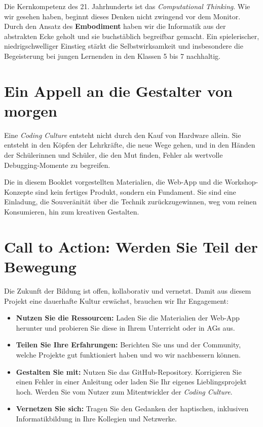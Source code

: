 \documentclass[a5paper,pagesize,10pt,bibtotoc,pointlessnumbers,
normalheadings,DIV=9,twoside=false]{scrbook}
\begin{document}
Die Kernkompetenz des 21. Jahrhunderts ist das \textit{Computational Thinking}. Wie wir gesehen haben, beginnt dieses Denken nicht zwingend vor dem Monitor. Durch den Ansatz des \textbf{Embodiment} haben wir die Informatik aus der abstrakten Ecke geholt und sie buchstäblich begreifbar gemacht. Ein spielerischer, niedrigschwelliger Einstieg stärkt die Selbstwirksamkeit und insbesondere die Begeisterung bei jungen Lernenden in den Klassen 5 bis 7 nachhaltig.

\section*{Ein Appell an die Gestalter von morgen}

Eine \textit{Coding Culture} entsteht nicht durch den Kauf von Hardware allein. Sie entsteht in den Köpfen der Lehrkräfte, die neue Wege gehen, und in den Händen der Schülerinnen und Schüler, die den Mut finden, Fehler als wertvolle Debugging-Momente zu begreifen. 

Die in diesem Booklet vorgestellten Materialien, die Web-App und die Workshop-Konzepte sind kein fertiges Produkt, sondern ein Fundament. Sie sind eine Einladung, die Souveränität über die Technik zurückzugewinnen, weg vom reinen Konsumieren, hin zum kreativen Gestalten.

\section*{Call to Action: Werden Sie Teil der Bewegung}

Die Zukunft der Bildung ist offen, kollaborativ und vernetzt. Damit aus diesem Projekt eine dauerhafte Kultur erwächst, brauchen wir Ihr Engagement:

\begin{itemize}
    \item \textbf{Nutzen Sie die Ressourcen:} Laden Sie die Materialien der Web-App herunter und probieren Sie diese in Ihrem Unterricht oder in AGs aus.
    \item \textbf{Teilen Sie Ihre Erfahrungen:} Berichten Sie uns und der Community, welche Projekte gut funktioniert haben und wo wir nachbessern können.
    \item \textbf{Gestalten Sie mit:} Nutzen Sie das GitHub-Repository. Korrigieren Sie einen Fehler in einer Anleitung oder laden Sie Ihr eigenes Lieblingsprojekt hoch. Werden Sie vom Nutzer zum Mitentwickler der \textit{Coding Culture}.
    \item \textbf{Vernetzen Sie sich:} Tragen Sie den Gedanken der haptischen, inklusiven Informatikbildung in Ihre Kollegien und Netzwerke.
\end{itemize}
\end{document}
